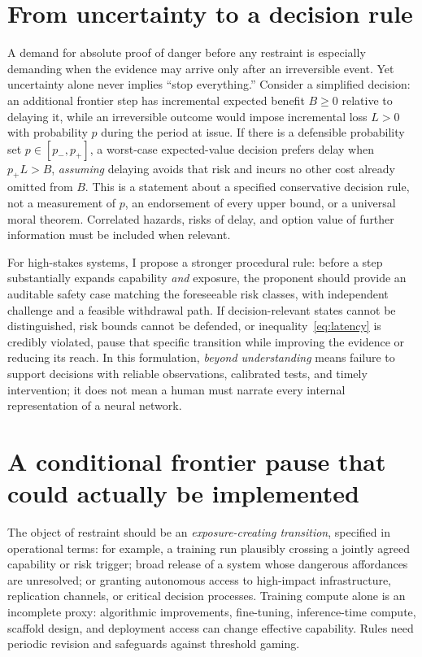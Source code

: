 \documentclass[11pt]{article}
\begin{document}
\section{From uncertainty to a decision rule}

A demand for absolute proof of danger before any restraint is especially demanding when the evidence may arrive only after an irreversible event. Yet uncertainty alone never implies ``stop everything.'' Consider a simplified decision: an additional frontier step has incremental expected benefit $B\geq0$ relative to delaying it, while an irreversible outcome would impose incremental loss $L>0$ with probability $p$ during the period at issue. If there is a defensible probability set $p\in[p_-,p_+]$, a worst-case expected-value decision prefers delay when $p_+L>B$, \emph{assuming} delaying avoids that risk and incurs no other cost already omitted from $B$. This is a statement about a specified conservative decision rule, not a measurement of $p$, an endorsement of every upper bound, or a universal moral theorem. Correlated hazards, risks of delay, and option value of further information must be included when relevant.

For high-stakes systems, I propose a stronger procedural rule: before a step substantially expands capability \emph{and} exposure, the proponent should provide an auditable safety case matching the foreseeable risk classes, with independent challenge and a feasible withdrawal path. If decision-relevant states cannot be distinguished, risk bounds cannot be defended, or inequality~\eqref{eq:latency} is credibly violated, pause that specific transition while improving the evidence or reducing its reach. In this formulation, \emph{beyond understanding} means failure to support decisions with reliable observations, calibrated tests, and timely intervention; it does not mean a human must narrate every internal representation of a neural network.

\section{A conditional frontier pause that could actually be implemented}

The object of restraint should be an \emph{exposure-creating transition}, specified in operational terms: for example, a training run plausibly crossing a jointly agreed capability or risk trigger; broad release of a system whose dangerous affordances are unresolved; or granting autonomous access to high-impact infrastructure, replication channels, or critical decision processes. Training compute alone is an incomplete proxy: algorithmic improvements, fine-tuning, inference-time compute, scaffold design, and deployment access can change effective capability. Rules need periodic revision and safeguards against threshold gaming.
\end{document}
